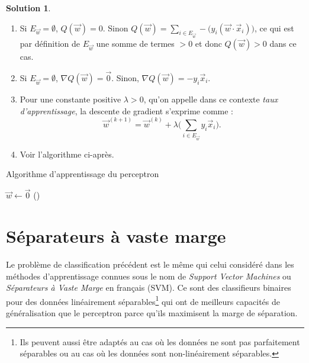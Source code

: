 \documentclass[a4paper,francais]{article}
\theoremstyle{definition}
\newtheorem*{solution}{Solution}
\begin{document}
\begin{solution}
  \begin{enumerate}
  \item Si $E_{\vec{w}} = \emptyset$, $Q(\vec{w}) = 0$.
    Sinon $Q(\vec{w}) = \sum_{i \in E_{\vec{w}}} - \big( y_i (\vec{w}\cdot\vec{x}_i) \big)$,
    ce qui est par définition de $E_{\vec{w}}$ une somme de termes $> 0$ et donc
    $Q(\vec{w}) > 0$ dans ce cas. 
  \item Si $E_{\vec{w}} = \emptyset$, ${\nabla Q}(\vec{w}) = \vec{0}$. Sinon,
    ${\nabla Q}(\vec{w}) = -y_i \vec{x}_i$.
  \item Pour une constante positive $\lambda > 0$, qu'on appelle dans ce
    contexte \emph{taux d'apprentissage}, la descente de gradient s'exprime
    comme :
    \[ \vec{w}^{(k+1)} = \vec{w}^{(k)} + \lambda \big( \sum_{i \in E_{\vec{w}}} y_i \vec{x}_i \big). \]
  \item Voir l'algorithme ci-après. 
  \end{enumerate}
    \begin{algorithm}[htbp]
    \caption{Algorithme d'apprentissage du perceptron}
    $\vec{w} \leftarrow \vec{0}$ \;
    ()
     \;
  \end{algorithm}
\end{solution}

\section{Séparateurs à vaste marge}
\label{sec:svm}

Le problème de classification précédent est le même qui celui considéré dans les
méthodes d'apprentissage connues sous le nom de \emph{Support Vector Machines}
ou \emph{Séparateurs à Vaste Marge} en français (SVM).
Ce sont des classifieurs binaires pour des données linéairement séparables\footnote{Ils
peuvent aussi être adaptés au cas où les données ne sont pas parfaitement séparables
ou au cas où les données sont non-linéairement séparables.} 
qui ont de meilleurs capacités de généralisation que le perceptron 
parce qu'ils maximisent la marge de séparation.
\end{document}
